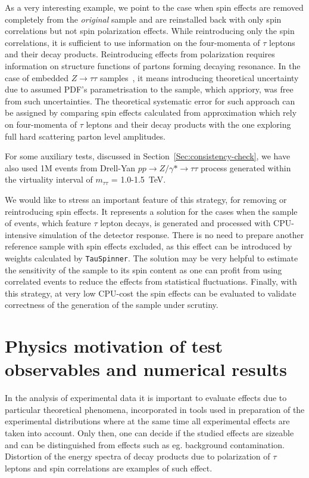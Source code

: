 \documentclass{article}
\begin{document}
As a very interesting example, we point to the case when spin effects are removed completely from 
the {\it original} sample and are reinstalled back with only spin correlations but not spin polarization effects.
While reintroducing only the spin correlations,  it is sufficient to use information on the
four-momenta of $\tau$ leptons and their decay products. Reintroducing effects from polarization
requires information on structure functions of partons forming decaying resonance. 
In the case of embedded $Z \to \tau \tau$ samples~\cite{embedding-atlas}, it means introducing theoretical uncertainty 
due to assumed PDF's parametrisation to the sample, which  appriory, was free from such uncertainties.
The theoretical systematic error for such approach can be assigned by comparing
spin effects calculated from approximation which rely on four-momenta of $\tau$ leptons
and their decay products with the one exploring full hard
scattering parton level amplitudes. 

For some auxiliary tests, discussed in Section~\ref{Sec:consistency-check}, we have also used 1M events 
from Drell-Yan $ pp \to Z/\gamma* \to \tau \tau $ process generated within the virtuality interval of $m_{\tau \tau}$ = 1.0-1.5~TeV. 

We would like to stress an important feature of this strategy,
for removing or reintroducing 
spin effects. It  represents a solution for the cases when the sample of events, which feature $\tau$ 
lepton decays, is generated and processed with CPU-intensive
simulation of the detector response. There is no need to 
prepare another reference sample with spin effects excluded, as this effect
can be introduced by  weights calculated by {\tt TauSpinner}.
The solution may be very helpful to estimate the  sensitivity of the sample to its spin content
as one can profit from using correlated events  to reduce the effects
from statistical fluctuations. 
Finally, with this strategy, at very low CPU-cost the spin effects can be evaluated  
to validate correctness of the generation of the sample under scrutiny.  

\section{Physics motivation of test observables and numerical results} \label{Sec:motivation}

In the analysis of experimental data it is important to evaluate effects 
due to particular theoretical phenomena, incorporated in tools 
used in preparation of the experimental 
distributions where at the same time all experimental effects are taken into account.
Only then, one can decide if the studied effects are sizeable and can be 
distinguished from  effects such as eg. background contamination.
Distortion of the energy spectra of decay products due to polarization of $\tau$ leptons 
and spin correlations are examples of such effect. 
\end{document}
